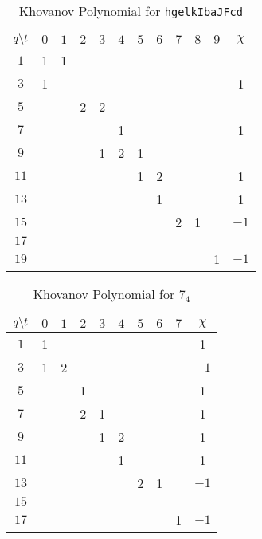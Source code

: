 \documentclass{article}
\theoremstyle{plain}
\begin{document}
        \begin{table}
            \centering
            \begin{tabular}{| c | c | c | c | c | c | c | c | c | c | c | c |}
                \hline
                $q\symbol{92}t$&$0$&$1$&$2$&$3$&$4$&$5$&$6$&$7$&$8$&$9$&$\chi$\\
                \hline
                $1$&1&1&&&&&&&&&\\
                \hline
                $3$&1&&&&&&&&&&1\\
                \hline
                $5$&&&2&2&&&&&&&\\
                \hline
                $7$&&&&&1&&&&&&1\\
                \hline
                $9$&&&&1&2&1&&&&&\\
                \hline
                $11$&&&&&&1&2&&&&1\\
                \hline
                $13$&&&&&&&1&&&&1\\
                \hline
                $15$&&&&&&&&2&1&&$-1$\\
                \hline
                $17$&&&&&&&&&&&\\
                \hline
                $19$&&&&&&&&&&1&$-1$\\
                \hline
            \end{tabular}
            \caption{Khovanov Polynomial for \texttt{hgelkIbaJFcd}}
        \end{table}
        \begin{table}
            \centering
            \begin{tabular}{| c | c | c | c | c | c | c | c | c | c |}
                \hline
                $q\symbol{92}t$&$0$&$1$&$2$&$3$&$4$&$5$&$6$&$7$&$\chi$\\
                \hline
                $1$&1&&&&&&&&1\\
                \hline
                $3$&1&2&&&&&&&$-1$\\
                \hline
                $5$&&&1&&&&&&1\\
                \hline
                $7$&&&2&1&&&&&1\\
                \hline
                $9$&&&&1&2&&&&1\\
                \hline
                $11$&&&&&1&&&&1\\
                \hline
                $13$&&&&&&2&1&&$-1$\\
                \hline
                $15$&&&&&&&&&\\
                \hline
                $17$&&&&&&&&1&$-1$\\
                \hline
            \end{tabular}
            \caption{Khovanov Polynomial for $7_{4}$}
        \end{table}
\end{document}
